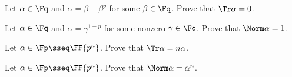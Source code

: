 \documentclass{article}
\begin{document}
\begin{subexercise} %
  Let \( \alpha\in\Fq \) and \( \alpha=\beta-\beta^p \) for some \( \beta\in\Fq \).
  Prove that \( \Tr \alpha = 0 \).
\end{subexercise}
\begin{solution}

\end{solution}

\begin{subexercise} %
Let \( \alpha\in\Fq \) and \( \alpha=\gamma^{1-p} \) for some nonzero \( \gamma\in\Fq \).
Prove that \( \Norm \alpha = 1 \).
\end{subexercise}
\begin{solution}

\end{solution}

\begin{subexercise} %
  Let \( \alpha\in\Fp \sseq \FF{p^n} \).
  Prove that \( \Tr \alpha = n\alpha \).
\end{subexercise}
\begin{solution}

\end{solution}

\begin{subexercise} %
  Let \( \alpha\in\Fp \sseq \FF{p^n} \).
  Prove that \( \Norm \alpha = \alpha^n \).
\end{subexercise}
\begin{solution}

\end{solution}
\end{document}
